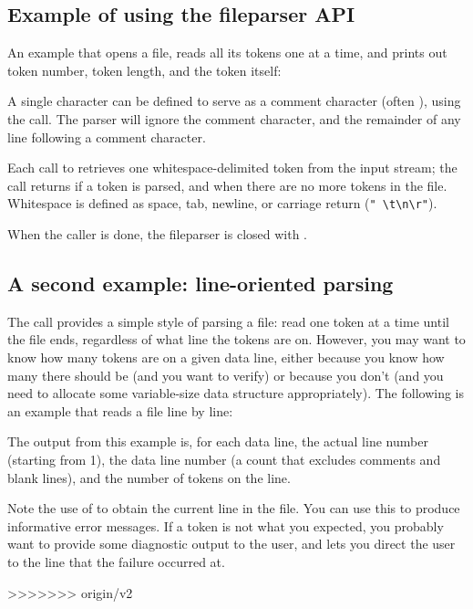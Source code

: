 \subsection{Example of using the fileparser API}

An example that opens a file, reads all its tokens one at a time, and
prints out token number, token length, and the token itself:



A single character can be defined to serve as a comment character
(often \ccode{\#}), using the 
call. The parser will ignore the comment character, and the remainder
of any line following a comment character.

Each call to  retrieves one
whitespace-delimited token from the input stream; the call returns
 if a token is parsed, and  when there are
no more tokens in the file. Whitespace is defined as space, tab,
newline, or carriage return (\verb+" \t\n\r"+).

When the caller is done, the fileparser is closed with
.

\subsection{A second example: line-oriented parsing}

The  call provides a simple style
of parsing a file: read one token at a time until the file ends,
regardless of what line the tokens are on. However, you may want to
know how many tokens are on a given data line, either because you know
how many there should be (and you want to verify) or because you don't
(and you need to allocate some variable-size data structure
appropriately). The following is an example that reads a file line by
line:



The output from this example is, for each data line, the actual line
number (starting from 1), the data line number (a count that excludes
comments and blank lines), and the number of tokens on the line.

Note the use of  to obtain the current line in
the file. You can use this to produce informative error messages.  If
a token is not what you expected, you probably want to provide some
diagnostic output to the user, and  lets you
direct the user to the line that the failure occurred at.







>>>>>>> origin/v2
